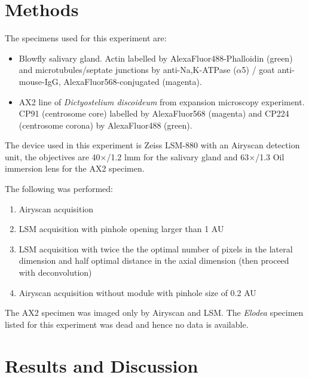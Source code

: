 
\section{Methods}
The specimens used for this experiment are: 
\begin{itemize}
\item Blowfly salivary gland. Actin labelled by AlexaFluor488-Phalloidin (green) and microtubules/septate junctions by anti-Na,K-ATPase ($\alpha$5) / goat anti-mouse-IgG, AlexaFluor568-conjugated (magenta).
\item AX2 line of \textit{Dictyostelium discoideum} from expansion microscopy experiment. CP91 (centrosome core) labelled by AlexaFluor568 (magenta) and CP224 (centrosome corona) by AlexaFluor488 (green). 
\end{itemize}

The device used in this experiment is Zeiss LSM-880 with an Airyscan detection unit, the objectives are 40$\times$/1.2 lmm for the salivary gland and 63$\times$/1.3 Oil immersion lens for the AX2 specimen. 

The following was performed:
\begin{enumerate}
\item Airyscan acquisition
\item LSM acquisition with pinhole opening larger than 1 AU
\item LSM acquisition with twice the the optimal number of pixels in the lateral dimension and half optimal distance in the axial dimension (then proceed with deconvolution)
\item Airyscan acquisition without module with pinhole size of 0.2 AU
\end{enumerate}

The AX2 specimen was imaged only by Airyscan and LSM. The \textit{Elodea} specimen listed for this experiment was dead and hence no data is available. 


\section{Results and Discussion}

